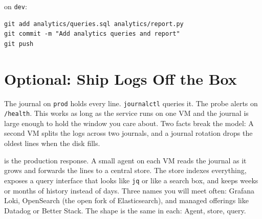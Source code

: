 
 on \texttt{dev}:

\begin{verbatim}
git add analytics/queries.sql analytics/report.py
git commit -m "Add analytics queries and report"
git push
\end{verbatim}



\newpage
\section{Optional: Ship Logs Off the Box}

The journal on \texttt{prod} holds every line. \texttt{journalctl}
queries it. The probe alerts on \texttt{/health}. This works as long
as the service runs on one VM and the journal is large enough to hold
the window you care about. Two facts break the model: A second VM
splits the logs across two journals, and a journal rotation drops the
oldest lines when the disk fills.

 is the production response.
A small agent on each VM reads the journal as it grows and forwards
the lines to a central store. The store indexes everything, exposes a
query interface that looks like \texttt{jq} or like a search box, and
keeps weeks or months of history instead of days. Three names you
will meet often: Grafana Loki, OpenSearch (the open fork of
Elasticsearch), and managed offerings like Datadog or Better Stack.
The shape is the same in each: Agent, store, query.



